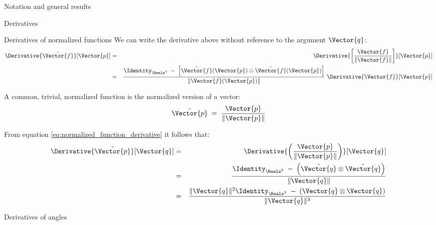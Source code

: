 \begin{plSection}{Notation and general results}
\begin{plSection}{Derivatives}
\begin{plSection}{Derivatives of normalized functions}
We can write the derivative above without reference 
to the argument $\Vector{q}$:
\begin{eqnarray}
\label{eq:normalized_function_derivative}
\Derivative{\tilde{\Vector{f}}}[\Vector{p}]
& = &
\Derivative
{\left[
\frac{\Vector{f}}{\|\Vector{f}\|}
\right]}
[\Vector{p}] \\
& = &
\frac{
\Identity_{\Reals^3} 
\;- \;
\left[
\tilde{\Vector{f}}(\Vector{p})
\otimes 
\tilde{\Vector{f}}(\Vector{p}) 
\right]
}
{\|\Vector{f}(\Vector{p})\|} 
\;
\Derivative{\Vector{f}}[\Vector{p}] \nonumber
\end{eqnarray}

A common, trivial, normalized function is the normalized version of
a vector:
\begin{equation}
\tilde{\Vector{p}} \;= \; \frac{\Vector{p}}{\|\Vector{p}\|}
\end{equation}

From equation \cref{eq:normalized_function_derivative}
it follows that:
\begin{eqnarray}
\label{eq:normalized_vector_derivative}
\Derivative{\tilde{\Vector{p}}}[\Vector{q}]
& = &
\Derivative
{\left(
\frac{\Vector{p}}{\|\Vector{p}\|}
\right)}
[\Vector{q}]
\\
& = &
\frac{
\Identity_{\Reals^3} 
\;- \;
\left( \tilde{\Vector{q}} \otimes \tilde{\Vector{q}} \right)
}
{\| \Vector{q} \|}
\nonumber
\\
& = &
\frac{
\|\Vector{q}\|^2
 \Identity_{\Reals^3} 
 \;- \;
 \left( \Vector{q} \otimes \Vector{q} \right) 
 }
{\| \Vector{q} \|^3} 
\nonumber
\end{eqnarray}

\end{plSection}%
\begin{plSection}{Derivatives of angles}
\label{sec:derivatives-of-angles}


\end{plSection}
\end{plSection}
\end{plSection}
